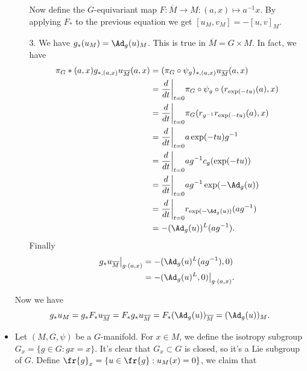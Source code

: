 \begin{itemize}
\begin{itemize}
            Now define the $G$-equivariant map $F:\overline{M}\to M:(a,x)\mapsto a^{-1}x$. By applying $F_*$ to the previous 
            equation we get $[u_M,v_M]=-[u,v]_M$.
            \item[3.] We have $g_*(u_M)=\Ad_g(u)_M$. This is true in $\overline{M}=G\times M$. In fact, we have 
            \begin{equation}
                \begin{split}
                    \pi_G*(a,x)g_{*,(a,x)}u_{\overline{M}}(a,x)
                    &=(\pi_G\circ\psi_g)_{*,(a,x)}u_{\overline{M}}(a,x)\\
                    &=\frac{d}{dt}\bigg|_{t=0}\pi_G\circ\psi_g\circ(r_{\exp(-tu)}(a),x)\\
                    &=\frac{d}{dt}\bigg|_{t=0}\pi_G(r_{g^{-1}}r_{\exp(-tu)}(a),x)\\
                    &=\frac{d}{dt}\bigg|_{t=0}a\exp(-tu)g^{-1}\\
                    &=\frac{d}{dt}\bigg|_{t=0}ag^{-1}c_g(\exp(-tu))\\
                    &=\frac{d}{dt}\bigg|_{t=0}ag^{-1}\exp(-\Ad_g(u))\\
                    &=\frac{d}{dt}\bigg|_{t=0}r_{\exp(-\Ad_g(u))}(ag^{-1})\\
                    &=-(\Ad_g(u))^L(ag^{-1}).
                \end{split}
            \end{equation}
            Finally 
            \begin{equation}
                \begin{split}
                    g_*u_{\overline{M}}\big|_{g\cdot(a,x)}&=-(\Ad_g(u)^L(ag^{-1}),0)\\
                    &=-(\Ad_g(u)^L,0)\big|_{g\cdot(a,x)}.
                \end{split}
            \end{equation}
        \end{itemize}
        Now we have 
        \begin{equation}
            g_*u_M=g_*F_*u_{\overline{M}}=F_*g_*u_{\overline{M}}=F_*(\Ad_g(u))_{\overline{M}}=(\Ad_g(u))_M.
        \end{equation}
        \item Let $(M,G,\psi)$ be a $G$-manifold. For $x\in M$, we define the isotropy subgroup 
        $G_x=\{g\in G:gx=x\}$. It's clear that $G_x\subset G$ is closed, so it's a Lie subgroup of $G$. Define 
        $\fr{g}_x=\{u\in\fr{g}:u_M(x)=0\}$, we claim that  

\end{itemize}

